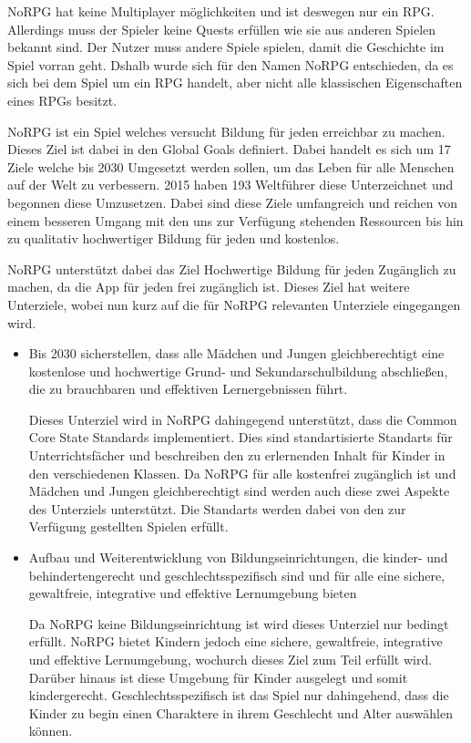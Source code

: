NoRPG hat keine Multiplayer möglichkeiten und ist deswegen nur ein RPG. Allerdings muss der Spieler keine Quests erfüllen wie sie aus anderen Spielen bekannt sind. Der Nutzer muss andere Spiele spielen, damit die Geschichte im Spiel vorran geht. Dshalb wurde sich für den Namen NoRPG entschieden, da es sich bei dem Spiel um ein RPG handelt, aber nicht alle klassischen Eigenschaften eines RPGs besitzt.
	
NoRPG ist ein Spiel welches versucht Bildung für jeden erreichbar zu machen. Dieses Ziel ist dabei in den Global Goals definiert. Dabei handelt es sich um 17 Ziele welche bis 2030 Umgesetzt werden sollen, um das Leben für alle Menschen auf der Welt zu verbessern. 2015 haben 193 Weltführer diese Unterzeichnet und begonnen diese Umzusetzen. Dabei sind diese Ziele umfangreich und reichen von einem besseren Umgang mit den uns zur Verfügung stehenden Ressourcen bis hin zu qualitativ hochwertiger Bildung für jeden und kostenlos.

NoRPG unterstützt dabei das Ziel Hochwertige Bildung für jeden Zugänglich zu machen, da die App für jeden frei zugänglich ist. Dieses Ziel hat weitere Unterziele, wobei nun kurz auf die für NoRPG relevanten Unterziele eingegangen wird.

\begin{itemize}
\item Bis 2030 sicherstellen, dass alle Mädchen und Jungen gleichberechtigt eine kostenlose und hochwertige Grund- und Sekundarschulbildung abschließen, die zu brauchbaren und effektiven Lernergebnissen führt.

Dieses Unterziel wird in NoRPG dahingegend unterstützt, dass die Common Core State Standards implementiert. Dies sind standartisierte Standarts für Unterrichtsfächer und beschreiben den zu erlernenden Inhalt für Kinder in den verschiedenen Klassen. Da NoRPG für alle kostenfrei zugänglich ist und Mädchen und Jungen gleichberechtigt sind werden auch diese zwei Aspekte des Unterziels unterstützt. Die Standarts werden dabei von den zur Verfügung gestellten Spielen erfüllt.

\item Aufbau und Weiterentwicklung von Bildungseinrichtungen, die kinder- und behindertengerecht und geschlechtsspezifisch sind und für alle eine sichere, gewaltfreie, integrative und effektive Lernumgebung bieten

Da NoRPG keine Bildungseinrichtung ist wird dieses Unterziel nur bedingt erfüllt. NoRPG bietet Kindern jedoch eine sichere, gewaltfreie, integrative und effektive Lernumgebung, wochurch dieses Ziel zum Teil erfüllt wird. Darüber hinaus ist diese Umgebung für Kinder ausgelegt und somit kindergerecht. Geschlechtsspezifisch ist das Spiel nur dahingehend, dass die Kinder zu begin einen Charaktere in ihrem Geschlecht und Alter auswählen können.

\end{itemize}

